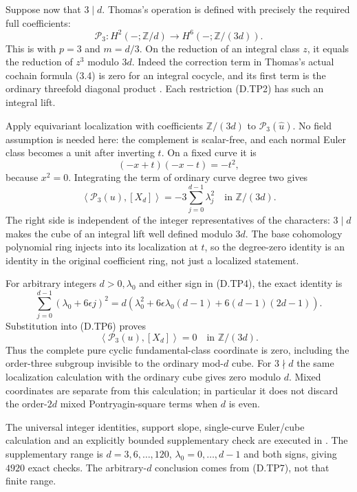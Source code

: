 Suppose now that $3\mid d$. Thomas's operation is defined
with precisely the required full coefficients:
\[
 \mathcal P_3:H^2(-;\mathbb Z/d)
                    \longrightarrow H^6(-;\mathbb Z/(3d)).
                                                               \tag{D.TP5}
\]
This is \cite[equation (2.1), p.267]{ffThomas56} with
$p=3$ and $m=d/3$. On the reduction of an integral
class $z$, it equals the reduction of $z^3$ modulo
$3d$. Indeed the correction term in Thomas's actual
cochain formula (3.4) is zero for an integral cocycle,
and its first term is the ordinary threefold diagonal
product \cite[equations (3.4)--(3.6), p.268]{ffThomas56}.
Each restriction (D.TP2) has such an integral lift.

Apply equivariant localization with coefficients
$\mathbb Z/(3d)$ to $\mathcal P_3(\widehat u)$.
No field assumption is needed here: the complement
is scalar-free, and each normal Euler class becomes
a unit after inverting $t$. On a fixed curve it is
\[
                    (-x+t)(-x-t)=-t^2,
\]
because $x^2=0$. Integrating the term of ordinary
curve degree two gives
\[
 \left\langle\mathcal P_3(u),[X_d]\right\rangle
                      =-3\sum_{j=0}^{d-1}\lambda_j^2
                                  \quad\text{in }\mathbb Z/(3d).
                                                               \tag{D.TP6}
\]
The right side is independent of the integer
representatives of the characters: $3\mid d$ makes
the cube of an integral lift well defined modulo
$3d$. The base cohomology polynomial ring injects
into its localization at $t$, so the degree-zero
identity is an identity in the original coefficient
ring, not just a localized statement.

For arbitrary integers $d>0,\lambda_0$ and either
sign in (D.TP4), the exact identity is
\[
 \sum_{j=0}^{d-1}(\lambda_0+6\epsilon j)^2
   =d\left(\lambda_0^2+6\epsilon\lambda_0(d-1)
                         +6(d-1)(2d-1)\right).              \tag{D.TP7}
\]
Substitution into (D.TP6) proves
\[
                 \left\langle\mathcal P_3(u),[X_d]\right\rangle=0
                                  \quad\text{in }\mathbb Z/(3d).
                                                               \tag{D.TP8}
\]
Thus the complete pure cyclic fundamental-class coordinate
is zero, including the order-three subgroup invisible to
the ordinary mod-$d$ cube. For $3\nmid d$ the same
localization calculation with the ordinary cube gives
zero modulo $d$. Mixed coordinates are separate from
this calculation; in particular it does not discard
the order-$2d$ mixed Pontryagin-square terms when $d$
is even.

The universal integer identities, support slope,
single-curve Euler/cube calculation and an explicitly
bounded supplementary check are executed in
.
The supplementary range is $d=3,6,\ldots,120$,
$\lambda_0=0,\ldots,d-1$ and both signs, giving
$4920$ exact checks. The arbitrary-$d$ conclusion
comes from (D.TP7), not that finite range.
